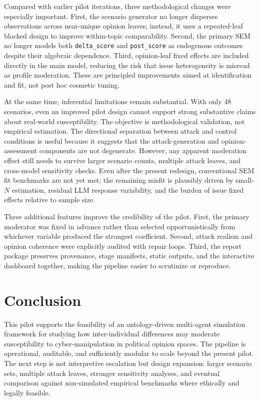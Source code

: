 \documentclass[11pt]{article}
\begin{document}
Compared with earlier pilot iterations, three methodological changes were especially important. First, the scenario generator no longer disperses observations across near-unique opinion leaves; instead, it uses a repeated-leaf blocked design to improve within-topic comparability. Second, the primary SEM no longer models both \texttt{delta\_score} and \texttt{post\_score} as endogenous outcomes despite their algebraic dependence. Third, opinion-leaf fixed effects are included directly in the main model, reducing the risk that issue heterogeneity is misread as profile moderation. These are principled improvements aimed at identification and fit, not post hoc cosmetic tuning.

At the same time, inferential limitations remain substantial. With only 48 scenarios, even an improved pilot design cannot support strong substantive claims about real-world susceptibility. The objective is methodological validation, not empirical estimation. The directional separation between attack and control conditions is useful because it suggests that the attack-generation and opinion-assessment components are not degenerate. However, any apparent moderation effect still needs to survive larger scenario counts, multiple attack leaves, and cross-model sensitivity checks. Even after the present redesign, conventional SEM fit benchmarks are not yet met; the remaining misfit is plausibly driven by small-$N$ estimation, residual LLM response variability, and the burden of issue fixed effects relative to sample size.

Three additional features improve the credibility of the pilot. First, the primary moderator was fixed in advance rather than selected opportunistically from whichever variable produced the strongest coefficient. Second, attack realism and opinion coherence were explicitly audited with repair loops. Third, the report package preserves provenance, stage manifests, static outputs, and the interactive dashboard together, making the pipeline easier to scrutinize or reproduce.

\section{Conclusion}
This pilot supports the feasibility of an ontology-driven multi-agent simulation framework for studying how inter-individual differences may moderate susceptibility to cyber-manipulation in political opinion spaces. The pipeline is operational, auditable, and sufficiently modular to scale beyond the present pilot. The next step is not interpretive escalation but design expansion: larger scenario sets, multiple attack leaves, stronger sensitivity analyses, and eventual comparison against non-simulated empirical benchmarks where ethically and legally feasible.
\end{document}
